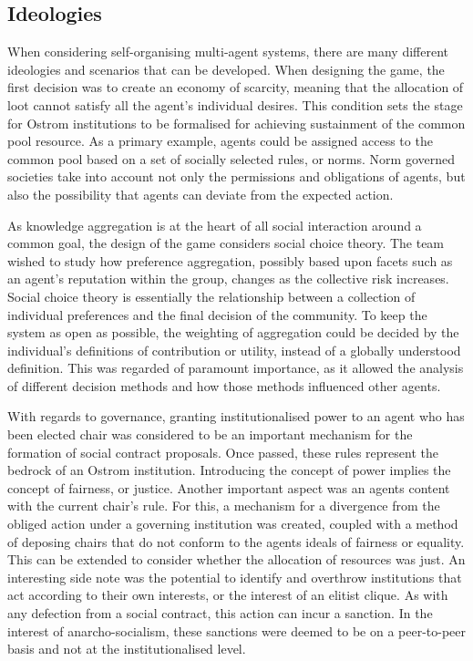 \subsection{Ideologies}\label{sec: ideologies}

When considering self-organising multi-agent systems, there are many different ideologies and scenarios that can be developed. When designing the game, the first decision was to create an economy of scarcity, meaning that the allocation of loot cannot satisfy all the agent's individual desires. This condition sets the stage for Ostrom institutions to be formalised for achieving sustainment of the common pool resource. As a primary example, agents could be assigned access to the common pool based on a set of socially selected rules, or norms. Norm governed societies take into account not only the permissions and obligations of agents, but also the possibility that agents can deviate from the expected action. 

As knowledge aggregation is at the heart of all social interaction around a common goal, the design of the game considers social choice theory. The team wished to study how preference aggregation, possibly based upon facets such as an agent's reputation within the group, changes as the collective risk increases. Social choice theory is essentially the relationship between a collection of individual preferences and the final decision of the community. To keep the system as open as possible, the weighting of aggregation could be decided by the individual's definitions of contribution or utility, instead of a globally understood definition. This was regarded of paramount importance, as it allowed the analysis of different decision methods and how those methods influenced other agents. 

With regards to governance, granting institutionalised power to an agent who has been elected chair was considered to be an important mechanism for the formation of social contract proposals. Once passed, these rules represent the bedrock of an Ostrom institution. Introducing the concept of power implies the concept of fairness, or justice. Another important aspect was an agents content with the current chair's rule. For this, a mechanism for a divergence from the obliged action under a governing institution was created, coupled with a method of deposing chairs that do not conform to the agents ideals of fairness or equality. This can be extended to consider whether the allocation of resources was just. An interesting side note was the potential to identify and overthrow institutions that act according to their own interests, or the interest of an elitist clique. As with any defection from a social contract, this action can incur a sanction. In the interest of anarcho-socialism, these sanctions were deemed to be on a peer-to-peer basis and not at the institutionalised level. 

